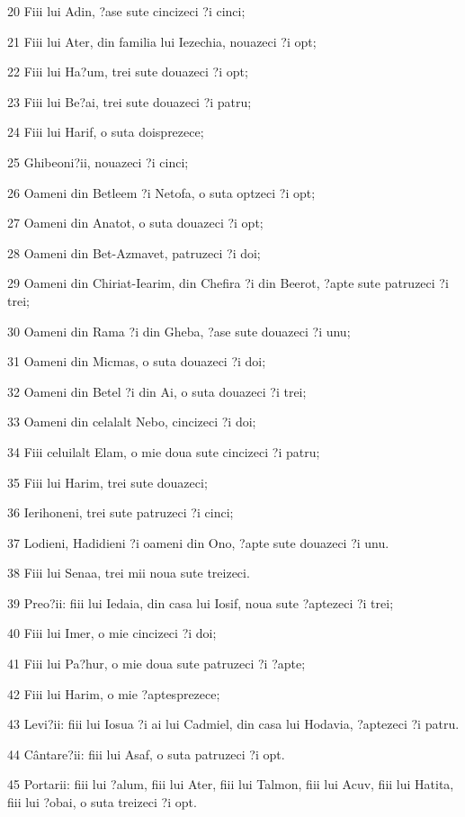 \par 20 Fiii lui Adin, ?ase sute cincizeci ?i cinci;
\par 21 Fiii lui Ater, din familia lui Iezechia, nouazeci ?i opt;
\par 22 Fiii lui Ha?um, trei sute douazeci ?i opt;
\par 23 Fiii lui Be?ai, trei sute douazeci ?i patru;
\par 24 Fiii lui Harif, o suta doisprezece;
\par 25 Ghibeoni?ii, nouazeci ?i cinci;
\par 26 Oameni din Betleem ?i Netofa, o suta optzeci ?i opt;
\par 27 Oameni din Anatot, o suta douazeci ?i opt;
\par 28 Oameni din Bet-Azmavet, patruzeci ?i doi;
\par 29 Oameni din Chiriat-Iearim, din Chefira ?i din Beerot, ?apte sute patruzeci ?i trei;
\par 30 Oameni din Rama ?i din Gheba, ?ase sute douazeci ?i unu;
\par 31 Oameni din Micmas, o suta douazeci ?i doi;
\par 32 Oameni din Betel ?i din Ai, o suta douazeci ?i trei;
\par 33 Oameni din celalalt Nebo, cincizeci ?i doi;
\par 34 Fiii celuilalt Elam, o mie doua sute cincizeci ?i patru;
\par 35 Fiii lui Harim, trei sute douazeci;
\par 36 Ierihoneni, trei sute patruzeci ?i cinci;
\par 37 Lodieni, Hadidieni ?i oameni din Ono, ?apte sute douazeci ?i unu.
\par 38 Fiii lui Senaa, trei mii noua sute treizeci.
\par 39 Preo?ii: fiii lui Iedaia, din casa lui Iosif, noua sute ?aptezeci ?i trei;
\par 40 Fiii lui Imer, o mie cincizeci ?i doi;
\par 41 Fiii lui Pa?hur, o mie doua sute patruzeci ?i ?apte;
\par 42 Fiii lui Harim, o mie ?aptesprezece;
\par 43 Levi?ii: fiii lui Iosua ?i ai lui Cadmiel, din casa lui Hodavia, ?aptezeci ?i patru.
\par 44 Cântare?ii: fiii lui Asaf, o suta patruzeci ?i opt.
\par 45 Portarii: fiii lui ?alum, fiii lui Ater, fiii lui Talmon, fiii lui Acuv, fiii lui Hatita, fiii lui ?obai, o suta treizeci ?i opt.
